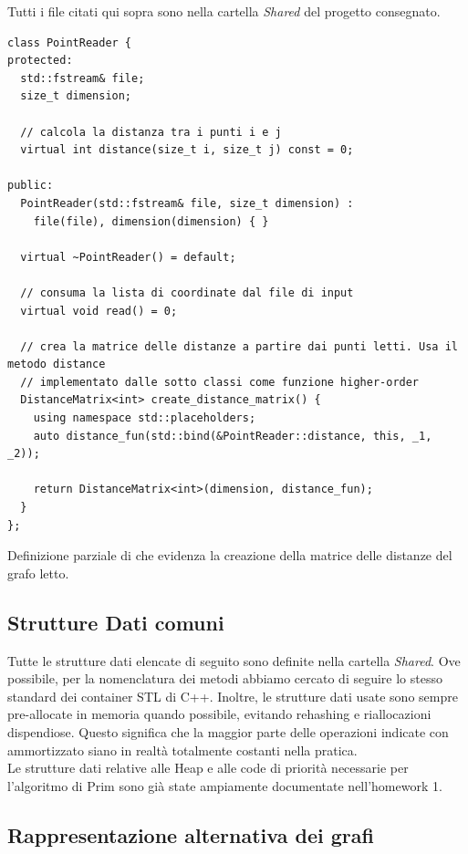 Tutti i file citati qui sopra sono nella cartella \textit{Shared} del progetto consegnato.

\begin{listing}[!ht]
\begin{verbatim}
class PointReader {
protected:
  std::fstream& file;
  size_t dimension;

  // calcola la distanza tra i punti i e j
  virtual int distance(size_t i, size_t j) const = 0;

public:
  PointReader(std::fstream& file, size_t dimension) :
    file(file), dimension(dimension) { }

  virtual ~PointReader() = default;

  // consuma la lista di coordinate dal file di input
  virtual void read() = 0;

  // crea la matrice delle distanze a partire dai punti letti. Usa il metodo distance
  // implementato dalle sotto classi come funzione higher-order
  DistanceMatrix<int> create_distance_matrix() {
    using namespace std::placeholders;
    auto distance_fun(std::bind(&PointReader::distance, this, _1, _2));

    return DistanceMatrix<int>(dimension, distance_fun);
  }
};
\end{verbatim}
\caption{Definizione parziale di  che evidenza la creazione della matrice delle distanze del grafo letto.}
\label{listing:point-reader}
\end{listing}

\subsection{Strutture Dati comuni}

Tutte le strutture dati elencate di seguito sono definite nella cartella \textit{Shared}.
Ove possibile, per la nomenclatura dei metodi abbiamo cercato di seguire lo stesso standard dei container STL di C++.
Inoltre, le strutture dati usate sono sempre pre-allocate in memoria quando possibile, evitando rehashing e riallocazioni dispendiose. Questo significa che la maggior parte delle operazioni indicate con \complexityConstant{} ammortizzato siano in realtà totalmente costanti nella pratica. \\

\noindent Le strutture dati relative alle Heap e alle code di priorità necessarie per l'algoritmo di Prim sono già state ampiamente documentate nell'homework 1.

\subsection{Rappresentazione alternativa dei grafi}
\label{alternative-graph-representation}

